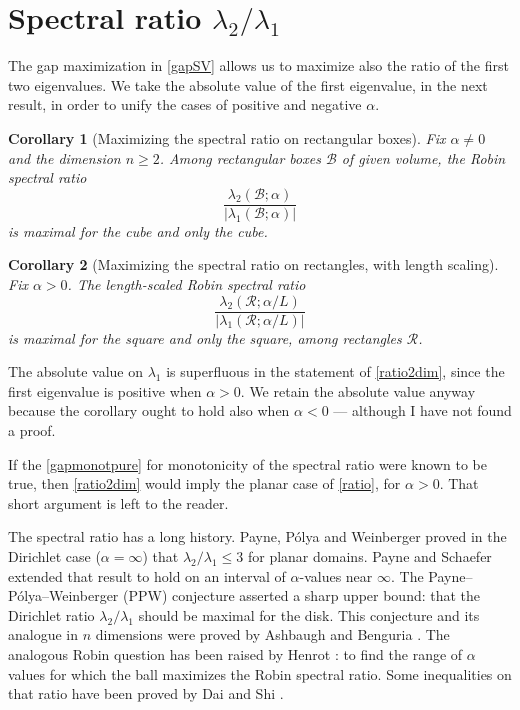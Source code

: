 \documentclass[12pt,reqno]{amsart}
\newtheorem{corollary}[corollary]{Corollary}
\theoremstyle{definition}
\begin{document}
\section*{Spectral ratio $\lambda_2/\lambda_1$} 

The gap maximization in \autoref{gapSV} allows us to maximize also the ratio of the first two eigenvalues. We take the absolute value of the first eigenvalue, in the next result, in order to unify the cases of positive and negative $\alpha$. 

%
\begin{corollary}[Maximizing the spectral ratio on rectangular boxes]\label{ratio} Fix $\alpha \neq 0$ and the dimension $n \geq 2$. Among rectangular boxes $\mathcal{B}$ of given volume, the  Robin spectral ratio 
\[
\frac{\lambda_2(\mathcal{B};\alpha)}{|\lambda_1(\mathcal{B};\alpha)|}
\]
is maximal for the cube and only the cube.  
\end{corollary}
%
\begin{corollary}[Maximizing the spectral ratio on rectangles, with length scaling]\label{ratio2dim} Fix $\alpha > 0$. The length-scaled Robin spectral ratio 
\[
\frac{\lambda_2(\mathcal{R};\alpha/L)}{|\lambda_1(\mathcal{R};\alpha/L)|}
\]
is maximal for the square and only the square, among rectangles $\mathcal{R}$.  
\end{corollary}
%
The absolute value on $\lambda_1$ is superfluous in the statement of \autoref{ratio2dim}, since the first eigenvalue is positive when $\alpha>0$. We retain the absolute value anyway because the corollary ought to hold also when $\alpha<0$ --- although I have not found a proof. 

If the \autoref{gapmonotpure} for monotonicity of the spectral ratio were known to be true, then \autoref{ratio2dim} would imply the planar case of \autoref{ratio}, for $\alpha>0$. That short argument is left to the reader. 

The spectral ratio has a long history. Payne, P\'{o}lya and Weinberger \cite{PPW55} proved in the Dirichlet case ($\alpha=\infty$) that $\lambda_2/\lambda_1 \leq 3$ for planar domains. Payne and Schaefer \cite[\S3]{PS01} extended that result to hold on an interval of $\alpha$-values near $\infty$. The Payne--P\'{o}lya--Weinberger (PPW) conjecture asserted a sharp upper bound: that the Dirichlet ratio $\lambda_2/\lambda_1$ should be maximal for the disk. This conjecture and its analogue in $n$ dimensions were proved by Ashbaugh and Benguria \cite{AB91}. The analogous Robin question has been raised by Henrot \cite[p.~458]{H03}: to find the range of $\alpha$ values for which the ball maximizes the Robin spectral ratio. Some inequalities on that ratio have been proved by Dai and Shi \cite{DS14}.
\end{document}

